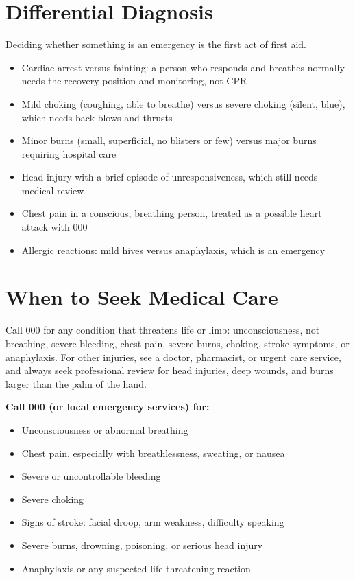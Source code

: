 \section*{Differential Diagnosis}
Deciding whether something is an emergency is the first act of first aid.
\begin{itemize}
    \item Cardiac arrest versus fainting: a person who responds and breathes normally needs the recovery position and monitoring, not CPR
    \item Mild choking (coughing, able to breathe) versus severe choking (silent, blue), which needs back blows and thrusts
    \item Minor burns (small, superficial, no blisters or few) versus major burns requiring hospital care
    \item Head injury with a brief episode of unresponsiveness, which still needs medical review
    \item Chest pain in a conscious, breathing person, treated as a possible heart attack with 000
    \item Allergic reactions: mild hives versus anaphylaxis, which is an emergency
\end{itemize}

\section*{When to Seek Medical Care}
Call 000 for any condition that threatens life or limb: unconsciousness, not breathing, severe bleeding, chest pain, severe burns, choking, stroke symptoms, or anaphylaxis. For other injuries, see a doctor, pharmacist, or urgent care service, and always seek professional review for head injuries, deep wounds, and burns larger than the palm of the hand.

\textbf{Call 000 (or local emergency services) for:}
\begin{itemize}
    \item Unconsciousness or abnormal breathing
    \item Chest pain, especially with breathlessness, sweating, or nausea
    \item Severe or uncontrollable bleeding
    \item Severe choking
    \item Signs of stroke: facial droop, arm weakness, difficulty speaking
    \item Severe burns, drowning, poisoning, or serious head injury
    \item Anaphylaxis or any suspected life-threatening reaction
\end{itemize}

